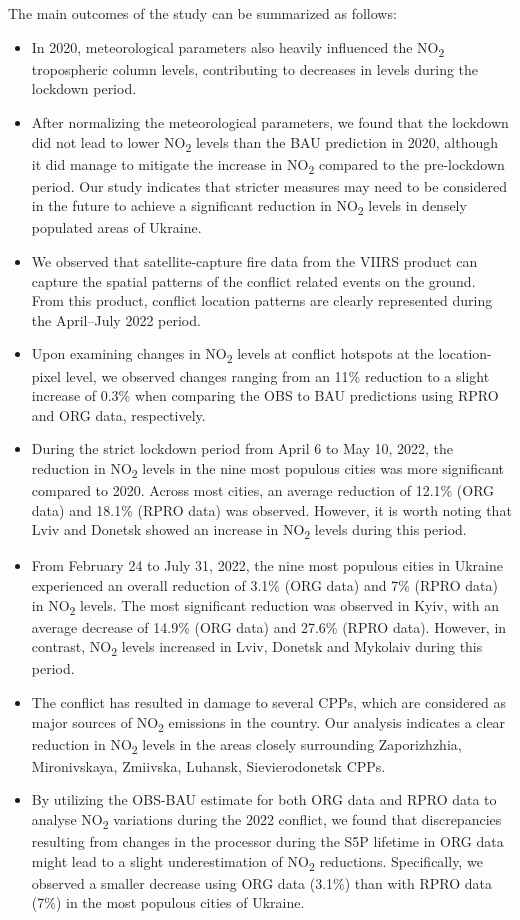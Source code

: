 The main outcomes of the study can be summarized as follows:\par
\begin{itemize}
    \item In 2020, meteorological parameters also heavily influenced the NO\textsubscript{2} tropospheric column levels, contributing to decreases in levels during the lockdown period.
    \item After normalizing the meteorological parameters, we found that the lockdown did not lead to lower NO\textsubscript{2} levels than the BAU prediction in 2020, although it did manage to mitigate the increase in NO\textsubscript{2} compared to the pre-lockdown period. Our study indicates that stricter measures may need to be considered in the future to achieve a significant reduction in NO\textsubscript{2} levels in densely populated areas of Ukraine.
    \item We observed that satellite-capture fire data from the VIIRS product can capture the spatial patterns of the conflict related events on the ground. From this product, conflict location patterns are clearly represented during the April–July 2022 period.
    \item Upon examining changes in NO\textsubscript{2} levels at conflict hotspots at the location-pixel level, we observed changes ranging from an 11\% reduction to a slight increase of 0.3\% when comparing the OBS to BAU predictions using RPRO and ORG data, respectively.
    \item During the strict lockdown period from April 6 to May 10, 2022, the reduction in NO\textsubscript{2} levels in the nine most populous cities was more significant compared to 2020. Across most cities, an average reduction of 12.1\% (ORG data) and 18.1\% (RPRO data) was observed. However, it is worth noting that Lviv and Donetsk showed an increase in NO\textsubscript{2} levels during this period.
    \item From February 24 to July 31, 2022, the nine most populous cities in Ukraine experienced an overall reduction of 3.1\% (ORG data) and 7\% (RPRO data) in NO\textsubscript{2} levels. The most significant reduction was observed in Kyiv, with an average decrease of 14.9\% (ORG data) and 27.6\% (RPRO data). However, in contrast, NO\textsubscript{2} levels increased in Lviv, Donetsk and Mykolaiv during this period.
    \item The conflict has resulted in damage to several CPPs, which are considered as major sources of NO\textsubscript{2} emissions in the country. Our analysis indicates a clear reduction in NO\textsubscript{2} levels in the areas closely surrounding Zaporizhzhia, Mironivskaya, Zmiivska, Luhansk, Sievierodonetsk CPPs.
    \item By utilizing the OBS-BAU estimate for both ORG data and RPRO data to analyse NO\textsubscript{2} variations during the 2022 conflict, we found that discrepancies resulting from changes in the processor during the S5P lifetime in ORG data might lead to a slight underestimation of NO\textsubscript{2} reductions. Specifically, we observed a smaller decrease using ORG data (3.1\%) than with RPRO data (7\%) in the most populous cities of Ukraine.
\end{itemize}

